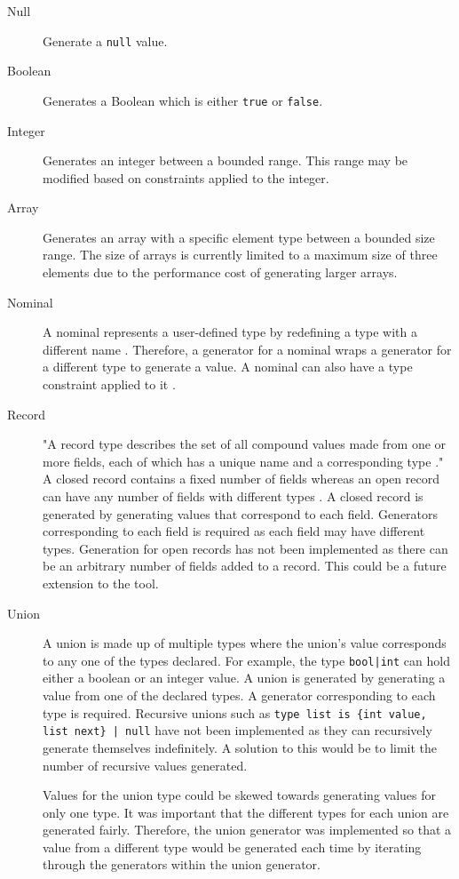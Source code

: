 \begin{description}
	\item[Null] Generate a \texttt{null} value.
	\item[Boolean] Generates a Boolean which is either \texttt{true} or \texttt{false}.
	\item[Integer] Generates an integer between a bounded range. This range may be modified based on constraints applied to the integer.
	\item[Array] Generates an array with a specific element type between a bounded size range.
	The size of arrays is currently limited to a maximum size of three elements due to the performance cost of generating larger arrays.
	\item[Nominal] A nominal represents a user-defined type by redefining a type with a different name \cite{WhileyLang}.
	Therefore, a generator for a nominal wraps a generator for a different type to generate a value. 
	A nominal can also have a type constraint applied to it \cite{WhileyLang}.
	\item[Record] "A record type describes the set of all compound values made from one or more fields, each of which has a unique name and a corresponding type \cite{WhileyLang}."
	A closed record contains a fixed number of fields whereas an open record can have any number of fields with different types \cite{WhileyLang}.
	A closed record is generated by generating values that correspond to each field. Generators corresponding to each field is required as each field may have different types. 
	Generation for open records has not been implemented as there can be an arbitrary number of fields added to a record. 
	This could be a future extension to the tool.
	\item[Union] A union is made up of multiple types where the union's value corresponds to any one of the types declared. For example, the type \texttt{bool|int} can hold either a boolean or an integer value. 
	A union is generated by generating a value from one of the declared types. A generator corresponding to each type is required.
	Recursive unions such as \texttt{type list is \{int value, list next\} | null} have not been implemented as they can recursively generate themselves indefinitely. 
	A solution to this would be to limit the number of recursive values generated.

	Values for the union type could be skewed towards generating values for only one type. It was important that the different types for each union are generated fairly. Therefore, the union generator was implemented so that a value from a different type would be generated each time by iterating through the generators within the union generator.

\end{description}

